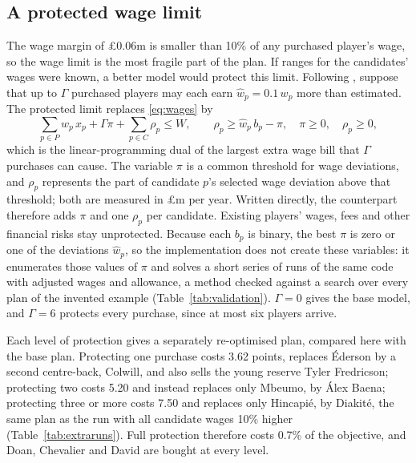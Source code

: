 \begin{table}[!htbp]
\centering
\caption{Sensitivity runs on the base scoring scale. ``Shared'' counts purchases also made in the base plan. Every run is listed in Appendix~\ref{app:results}, Table~\ref{tab:allruns}.}\label{tab:sensitivity}
\end{table}

\subsection{A protected wage limit}\label{sec:robust}

The wage margin of \pounds 0.06m is smaller than 10\% of any purchased player's wage, so the wage limit is the most fragile part of the plan. If ranges for the candidates' wages were known, a better model would protect this limit. Following \citet{bertsimas2004}, suppose that up to $\Gamma$ purchased players may each earn $\hat{w}_p = 0.1\,w_p$ more than estimated. The protected limit replaces \eqref{eq:wages} by
\begin{equation}\label{eq:robust}
\sum_{p \in P} w_p\, x_p + \Gamma \pi + \sum_{p \in C} \rho_p \le W, \qquad \rho_p \ge \hat{w}_p\, b_p - \pi, \quad \pi \ge 0, \quad \rho_p \ge 0,
\end{equation}
which is the linear-programming dual of the largest extra wage bill that $\Gamma$ purchases can cause. The variable $\pi$ is a common threshold for wage deviations, and $\rho_p$ represents the part of candidate $p$'s selected wage deviation above that threshold; both are measured in \pounds m per year. Written directly, the counterpart therefore adds $\pi$ and one $\rho_p$ per candidate. Existing players' wages, fees and other financial risks stay unprotected. Because each $b_p$ is binary, the best $\pi$ is zero or one of the deviations $\hat{w}_p$, so the implementation does not create these variables: it enumerates those values of $\pi$ and solves a short series of runs of the same code with adjusted wages and allowance, a method checked against a search over every plan of the invented example (Table~\ref{tab:validation}). $\Gamma = 0$ gives the base model, and $\Gamma = 6$ protects every purchase, since at most six players arrive.

Each level of protection gives a separately re-optimised plan, compared here with the base plan. Protecting one purchase costs 3.62 points, replaces Éderson by a second centre-back, Colwill, and also sells the young reserve Tyler Fredricson; protecting two costs 5.20 and instead replaces only Mbeumo, by Álex Baena; protecting three or more costs 7.50 and replaces only Hincapié, by Diakité, the same plan as the run with all candidate wages 10\% higher (Table~\ref{tab:extraruns}). Full protection therefore costs 0.7\% of the objective, and Doan, Chevalier and David are bought at every level.

